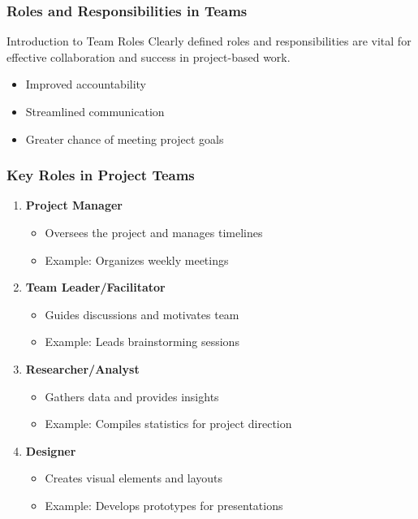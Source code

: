 \documentclass[aspectratio=169]{beamer}
\begin{document}
\begin{frame}[fragile]
    \frametitle{Roles and Responsibilities in Teams}
    \begin{block}{Introduction to Team Roles}
    Clearly defined roles and responsibilities are vital for effective collaboration and success in project-based work.
    \end{block}
    \begin{itemize}
        \item Improved accountability
        \item Streamlined communication
        \item Greater chance of meeting project goals
    \end{itemize}
\end{frame}

\begin{frame}[fragile]
    \frametitle{Key Roles in Project Teams}
    \begin{enumerate}
        \item \textbf{Project Manager}
            \begin{itemize}
                \item Oversees the project and manages timelines
                \item Example: Organizes weekly meetings
            \end{itemize}
        \item \textbf{Team Leader/Facilitator}
            \begin{itemize}
                \item Guides discussions and motivates team
                \item Example: Leads brainstorming sessions
            \end{itemize}
        \item \textbf{Researcher/Analyst}
            \begin{itemize}
                \item Gathers data and provides insights
                \item Example: Compiles statistics for project direction
            \end{itemize}
        \item \textbf{Designer}
            \begin{itemize}
                \item Creates visual elements and layouts
                \item Example: Develops prototypes for presentations
            \end{itemize}
    \end{enumerate}
\end{frame}
\end{document}
